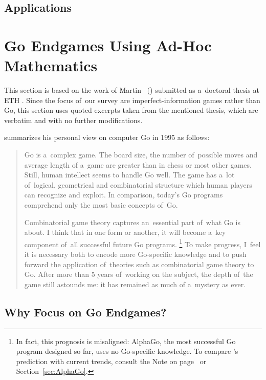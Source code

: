 \subsection{Applications}
\todo

\section{Go Endgames Using Ad-Hoc Mathematics}

This section is based on the work of Martin~\Mueller{} (\cite{Muller1995computer}) submitted as a~doctoral thesis at ETH \Zurich.
Since the focus of~our survey are imperfect-information games rather than Go, this section uses quoted excerpts taken from the mentioned thesis, which are verbatim and with no further modifications.

\Mueller{} summarizes his personal view on computer Go in 1995 as follows:
\begin{quotation}
  Go is a~complex game.
  The board size, the number of~possible moves and average length of a~game are greater than in chess or most other games.
  Still, human intellect seems to handle Go well.
  The game has a~lot of~logical, geometrical and combinatorial structure which human players can recognize and exploit.
  In comparison, today’s Go programs comprehend only the most basic concepts of~Go.

  Combinatorial game theory captures an~essential part of~what Go is about.
  I think that in one form or another, it will become a~key component of~all successful future Go programs.%
  \footnote{
    In fact, this prognosis is misaligned:
    AlphaGo, the most successful Go program designed so far, uses no Go-specific knowledge.
    To compare \Mueller's prediction with current trends, consult the Note on page~\pageref{note:CGTvsAlphaGo} or Section~\ref{sec:AlphaGo}.
  }
  To make progress, I~feel it is necessary both to encode more Go-specific knowledge and to push forward the application of~theories such as combinatorial game theory to Go.
  After more than 5 years of~working on the subject, the depth of~the game still astounds me:
  it has remained as much of a~mystery as ever.
\end{quotation}

\subsection{Why Focus on Go Endgames?}

